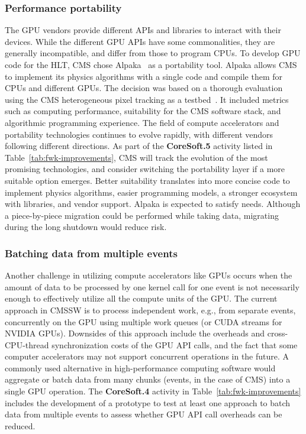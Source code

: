 \subsubsection{Performance portability}
\label{sec:portability}

The \gls{GPU} vendors provide different \glspl{API} and libraries to interact with their devices. While the different \gls{GPU} \glspl{API} have some commonalities, they are generally incompatible, and differ from those to program \glspl{CPU}. To develop \gls{GPU} code for the \gls{HLT}, CMS chose Alpaka~\cite{worpitz:2015,zenker:2016,matthes:2017} as a portability tool. Alpaka allows CMS to implement its physics algorithms with a single code and compile them for \glspl{CPU} and different \glspl{GPU}. The decision was based on a thorough evaluation~\cite{kortelainen:2021a,bocci:2023} using the CMS heterogeneous pixel tracking as a testbed~\cite{Bocci:2020pmi}. It included metrics such as computing performance, suitability for the CMS software stack, and algorithmic programming experience. The field of compute accelerators and portability technologies continues to evolve rapidly, with different vendors following different directions. As part of the \textbf{CoreSoft.5} activity listed in Table~\ref{tab:fwk-improvements}, CMS will track the evolution of the most promising technologies, and consider switching the portability layer if a more suitable option emerges. Better suitability translates into more concise code to implement physics algorithms, easier programming models, a stronger ecosystem with libraries, and vendor support. Alpaka is expected to satisfy \RunFour needs. Although a piece-by-piece migration could be performed while taking data, migrating during the long shutdown would reduce risk.

\subsubsection{Batching data from multiple events}

Another challenge in utilizing compute accelerators like \glspl{GPU} occurs when the amount of data to be processed by one kernel call for one event is not necessarily enough to effectively utilize all the compute units of the \gls{GPU}. The current approach in \gls{CMSSW} is to process independent work, e.g., from separate events, concurrently on the \gls{GPU} using multiple work queues (or \gls{CUDA} streams for NVIDIA \glspl{GPU}). Downsides of this approach include the overheads and cross-\gls{CPU}-thread synchronization costs of the \gls{GPU} \gls{API} calls, and the fact that some computer accelerators may not support concurrent operations in the future. A commonly used alternative in high-performance computing software would aggregate or batch data from many chunks (events, in the case of CMS) into a single \gls{GPU} operation. The \textbf{CoreSoft.4} activity in Table~\ref{tab:fwk-improvements} includes the development of a prototype to test at least one approach to batch data from multiple events to assess whether \gls{GPU} \gls{API} call overheads can be reduced.

